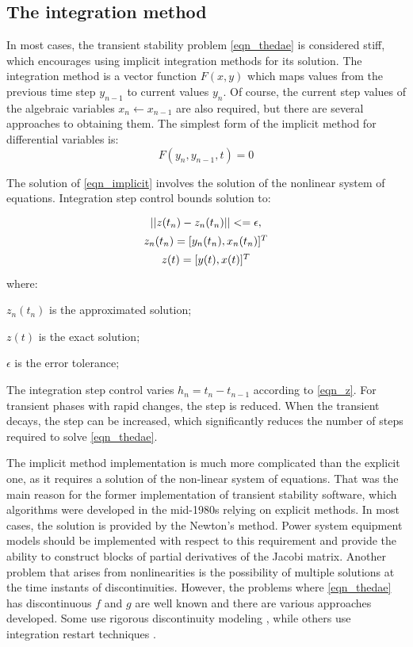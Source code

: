 \documentclass[lettersize,journal]{IEEEtran}
\begin{document}
\subsection{The integration method}

In most cases, the transient stability problem \eqref{eqn_thedae} is considered stiff, which encourages using implicit integration methods for its solution. The integration method is a vector function \(F(x,y)\) which maps values from the previous time step \(y_{n-1}\) to current values \(y_n\). Of course, the current step values of the algebraic variables \(x_{n} \leftarrow x_{n-1}\) are also required, but there are several approaches to obtaining them. The simplest form of the implicit method for differential variables is:
\begin{equation}
	\label{eqn_implicit}
	F(y_n,y_{n-1},t)=0
\end{equation}

The solution of \eqref{eqn_implicit} involves the solution of the nonlinear system of equations. Integration step control bounds solution to:
\begin{equation}
	\label{eqn_z}
	\def\arraystretch{1.4}
	\begin{array}{c}
		\vert\vert z(t_n)-z_n(t_n) \vert\vert <= \epsilon, \\
		z_n(t_n)=[y_n(t_n), x_n(t_n)]^T	 \\
		z(t)=[y(t), x(t)]^T \\
	\end{array}
\end{equation}
\noindent where:
\begin{description}
	\item  \(z_n(t_n)\) is the approximated solution;
	\item  \(z(t)\) is the exact solution;
	\item  \(\epsilon\) is the error tolerance;
\end{description}

The integration step control varies \(h_{n}=t_{n}-t_{n-1}\) according to \eqref{eqn_z}. For transient phases with rapid changes, the step is reduced. When the transient decays, the step can be increased, which significantly reduces the number of steps required to solve \eqref{eqn_thedae}.

The implicit method implementation is much more complicated than the explicit one, as it requires a solution of the non-linear system of equations. That was the main reason for the former implementation of transient stability software, which algorithms were developed in the mid-1980s relying on explicit methods. In most cases, the solution is provided by the Newton's method. Power system equipment models should be implemented with respect to this requirement and provide the ability to construct blocks of partial derivatives of the Jacobi matrix. Another problem that arises from nonlinearities is the possibility of multiple solutions at the time instants of discontinuities. However, the problems where \eqref{eqn_thedae} has discontinuous \(f\) and \(g\) are well known and there are various approaches developed. Some use rigorous discontinuity modeling \cite{Filippov1988}, while others use integration restart techniques \cite{cellier06}.
\end{document}
